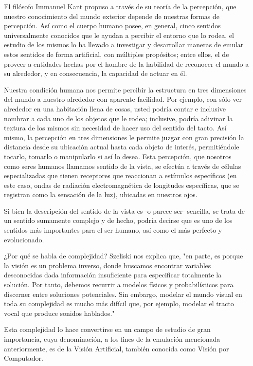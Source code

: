 El filósofo Immanuel Kant propuso a través de su teoría de la percepción, que nuestro conocimiento del mundo exterior depende de nuestras formas de percepción. Así como el cuerpo humano posee, en general, cinco sentidos universalmente conocidos que le ayudan a percibir el entorno que lo rodea, el estudio de los mismos lo ha llevado a investigar y desarrollar maneras de emular estos sentidos de forma artificial, con múltiples propósitos; entre ellos, el de proveer a entidades hechas por el hombre de la habilidad de reconocer el mundo a su alrededor, y en consecuencia, la capacidad de actuar en él.

Nuestra condición humana nos permite percibir la estructura en tres dimensiones del mundo a nuestro alrededor con aparente facilidad. Por ejemplo, con sólo ver alrededor en una habitación llena de cosas, usted podría contar e inclusive nombrar a cada uno de los objetos que le rodea; inclusive, podría adivinar la textura de los mismos sin necesidad de hacer uso del sentido del tacto. Así mismo, la percepción en tres dimensiones le permite juzgar con gran precisión la distancia desde su ubicación actual hasta cada objeto de interés, permitiéndole tocarlo, tomarlo o manipularlo si así lo desea. Esta percepción, que nosotros como seres humanos llamamos sentido de la vista, se efectúa a través de células especializadas que tienen receptores que reaccionan a estímulos específicos (en este caso, ondas de radiación electromagnética de longitudes específicas, que se registran como la sensación de la luz), ubicadas en nuestros ojos.

Si bien la descripción del sentido de la vista es -o parece ser- sencilla, se trata de un sentido sumamente complejo y de hecho, podría decirse que es uno de los sentidos más importantes para el ser humano, así como el más perfecto y evolucionado. 

¿Por qué se habla de complejidad? Szeliski nos explica que, "en parte, es porque la visión es un problema inverso, donde buscamos encontrar variables desconocidas dada información insuficiente para especificar totalmente la solución. Por tanto, debemos recurrir a modelos físicos y probabilísticos para discerner entre soluciones potenciales. Sin embargo, modelar el mundo visual en toda su complejidad es mucho más difícil que, por ejemplo, modelar el tracto vocal que produce sonidos hablados."\citep{RS:09}

Esta complejidad lo hace convertirse en un campo de estudio de gran importancia, cuya denominación, a los fines de la
emulación mencionada anteriormente, es de la Visión Artificial, también conocida como Visión por Computador.

